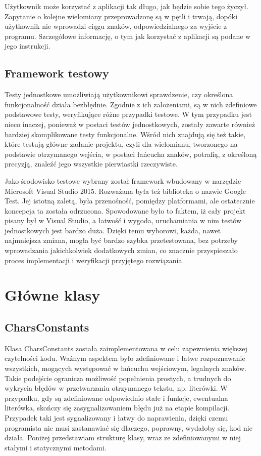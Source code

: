 \documentclass[twoside,a4paper]{book}
\begin{document}
Użytkownik może korzystać z aplikacji tak długo, jak będzie sobie tego życzył. Zapytanie o kolejne wielomiany przeprowadzonę są w pętli i trwają, dopóki użytkownik nie wprowadzi ciągu znaków, odpowiedzialnego za wyjście z programu. Szczegółowe informację, o tym jak korzystać z aplikacji są podane w jego instrukcji.

\subsection{Framework testowy}
Testy jednostkowe umożliwiają użytkownikowi sprawdzenie, czy określona funkcjonalność działa bezbłędnie. Zgodnie z ich założeniami, są w nich zdefiniowe podstawowe testy, weryfikujące różne przypadki testowe. W tym przypadku jest nieco inaczej, ponieważ w postaci testów jednostkowych, zostały zawarte również bardziej skomplikowane testy funkcjonalne. Wśród nich znajdują się też takie, które testują główne zadanie projektu, czyli dla wielomianu, tworzonego na podstawie otrzymanego wejścia, w postaci łańcucha znaków, potrafią, z określoną precyzją, znaleźć jego wszystkie pierwiastki rzeczywiste.

Jako środowisko testowe wybrany został framework wbudowany w narzędzie Microsoft Visual Studio 2015. Rozważana była też biblioteka o nazwie Google Test. Jej istotną zaletą, była przenośność, pomiędzy platformami, ale ostatecznie koncepcja ta została odrzucona. Spowodowane było to faktem, iż cały projekt pisany był w Visual Studio, a łatwość i wygoda, uruchamiania w nim testów jednostkowych jest bardzo duża. Dzięki temu wyborowi, każda, nawet najmniejsza zmiana, mogła być bardzo szybka przetestowana, bez potrzeby wprowadzania jakichkolwiek dodatkowych zmian, co znacznie przyspieszało proces implementacji i weryfikacji przyjętego rozwiązania.

\section{Główne klasy}

\subsection{CharsConstants}

Klasa CharsConstants została zaimplementowana w celu zapewnienia większej czytelności kodu. Ważnym aspektem było zdefiniowane i łatwe rozpoznawanie wszystkich, mogących występować w łańcuchu wejściowym, legalnych znaków. Takie podejście ogranicza możliwość popełnienia prostych, a trudnych do wykrycia błędów w przetwarzaniu otrzymanego tekstu, np. literówki. W przypadku, gdy są zdefiniowane odpowiednio stałe i funkcje, ewentualna literówka, skończy się zasygnalizowaniem błędu już na etapie kompilacji. Przypadek taki jest sygnalizowany i łatwy do naprawienia, dzięki czemu programista nie musi zastanawiać się dlaczego, poprawny, wydałoby się, kod nie działa. Poniżej przedstawiam strukturę klasy, wraz ze zdefiniowanymi w niej stałymi i statycznymi metodami. 
\end{document}
